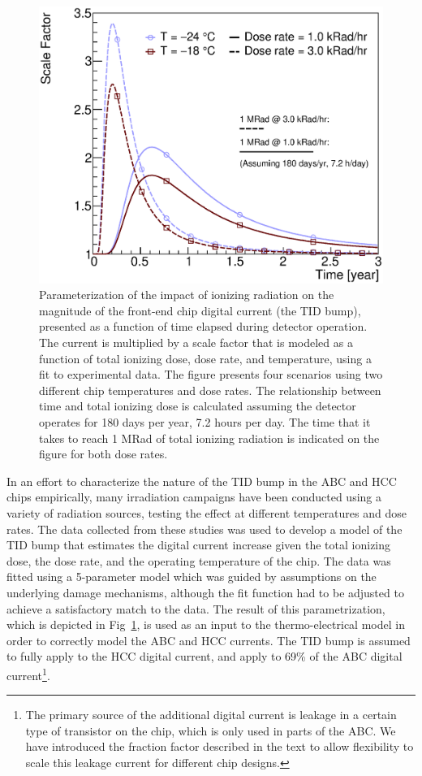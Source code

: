 \begin{figure}[ht]
\centering
\includegraphics[width=0.45\linewidth]{figures/AbcTidBumpVersionRatesAndTemps_Nominal.eps}
\caption{
Parameterization of the impact of ionizing radiation
on the magnitude of the front-end chip digital current (the TID bump), presented as a function of time
elapsed during detector operation.
The current is multiplied by a scale factor that is modeled as a function of total ionizing dose,
dose rate, and temperature, using a fit to experimental data.
The figure presents four scenarios using two different chip temperatures and dose rates.
The relationship between time and total ionizing dose is calculated assuming the detector operates
for 180 days per year, 7.2 hours per day.
The time that it takes to reach 1 MRad of total ionizing radiation is indicated on the figure for both dose rates.
}
\label{tid_bump}
\end{figure}

In an effort to characterize the nature of the TID bump in the ABC and HCC chips empirically,
many irradiation campaigns have been conducted using a variety of radiation sources, testing
the effect at different temperatures and dose rates.
The data collected from these studies was used to develop a model of the TID bump
that estimates the digital current increase given the total ionizing dose, the dose rate,
and the operating temperature of the chip.
The data was fitted using a 5-parameter model which was guided by assumptions on the underlying
damage mechanisms, although the fit function had to be adjusted to achieve a satisfactory match to the data.
The result of this parametrization, which is depicted in
Fig~\ref{tid_bump}, is used as an input to the thermo-electrical model in order to correctly model the
ABC and HCC currents. The TID bump is assumed to fully apply to the HCC digital current, and apply to
69\% of the ABC digital current\footnote{
The primary source of the additional digital current is leakage in a certain type of transistor on the chip,
which is only used in parts of the ABC. We have introduced the fraction factor described in the text
to allow flexibility to scale this leakage current for different chip designs.}.

